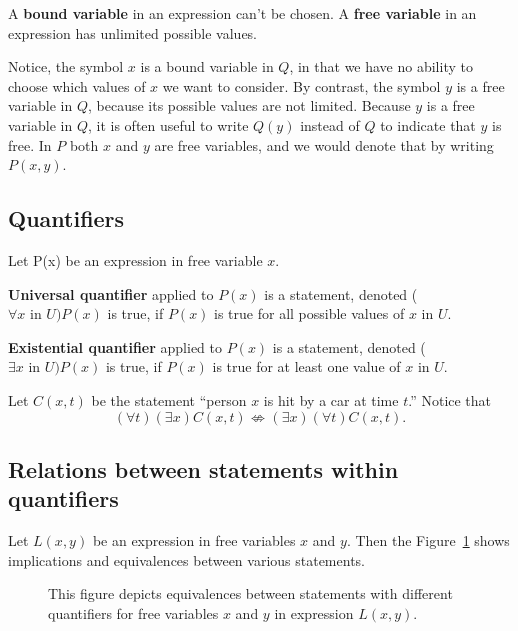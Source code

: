 \documentclass[a4paper,english,12pt]{article}
\begin{document}
\begin{defn}A \textbf{bound variable} in an expression can't be chosen. A \textbf{free variable} in an expression has unlimited possible values.
\end{defn}

Notice, the symbol $x$ is a bound variable in $Q$, in that we have no ability to choose which values of $x$ we want to consider. By contrast, the symbol $y$ is a free variable in $Q$, because its possible values are not limited. Because $y$ is a free variable in $Q$, it is often useful to write $Q(y)$ instead of $Q$ to indicate that $y$ is free. In $P$ both $x$ and $y$ are free variables, and we would denote that by writing $P(x,y)$.
\subsection{Quantifiers}
Let P(x) be an expression in free variable $x$.
\begin{defn} \textbf{Universal quantifier} applied to $P(x)$ is a statement, denoted ($\forall x \text{ in } U)P(x)$ is true, if $P(x)$ is true for all possible values of $x$ in $U$.
\end{defn}
\begin{defn} \textbf{Existential quantifier} applied to $P(x)$ is a statement, denoted ($\exists x \text{ in }U)P(x)$ is true, if $P(x)$ is true for at least one value of $x$ in $U$.
\end{defn}
\begin{exmp} Let $C(x,t)$ be the statement ``person $x$ is hit by a car at time $t$.'' Notice that
\begin{equation*}
(\forall t)(\exists x) C(x,t) \not\Leftrightarrow (\exists x)(\forall t)C(x,t).
\end{equation*}
\end{exmp} 

\subsection{Relations between statements within quantifiers}

Let $L(x,y)$ be an expression in free variables $x$ and $y$. Then the Figure~\ref{Fig:Equivalences} shows implications and equivalences between various statements.
\begin{figure}[hhhh]
\centering
\scalebox{.8}{}
\caption{This figure depicts equivalences between statements with different quantifiers for free variables $x$ and $y$ in expression $L(x,y)$.}
\label{Fig:Equivalences}
\end{figure}
\end{document}
